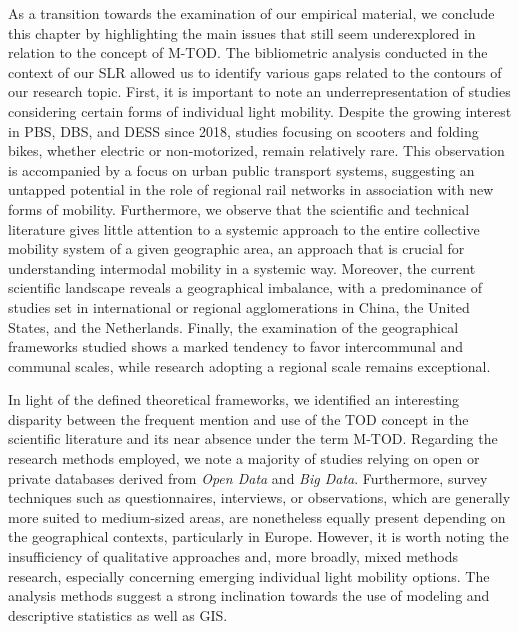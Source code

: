 \begin{refsegment}
As a transition towards the examination of our empirical material, we conclude this chapter by highlighting the main issues that still seem underexplored in relation to the concept of \acrshort{M-TOD}. The bibliometric analysis conducted in the context of our \acrshort{SLR} allowed us to identify various gaps related to the contours of our research topic. First, it is important to note an underrepresentation of studies considering certain forms of individual light mobility. Despite the growing interest in \acrshort{PBS}, \acrshort{DBS}, and \acrshort{DESS} since 2018, studies focusing on scooters and folding bikes, whether electric or non-motorized, remain relatively rare. This observation is accompanied by a focus on urban public transport systems, suggesting an untapped potential in the role of regional rail networks in association with new forms of mobility. Furthermore, we observe that the scientific and technical literature gives little attention to a systemic approach to the entire collective mobility system of a given geographic area, an approach that is crucial for understanding intermodal mobility in a systemic way. Moreover, the current scientific landscape reveals a geographical imbalance, with a predominance of studies set in international or regional agglomerations in China, the United States, and the Netherlands. Finally, the examination of the geographical frameworks studied shows a marked tendency to favor intercommunal and communal scales, while research adopting a regional scale remains exceptional.%

In light of the defined theoretical frameworks, we identified an interesting disparity between the frequent mention and use of the \acrshort{TOD} concept in the scientific literature and its near absence under the term \acrshort{M-TOD}. Regarding the research methods employed, we note a majority of studies relying on open or private databases derived from \textsl{Open Data} and \textsl{Big Data}. Furthermore, survey techniques such as questionnaires, interviews, or observations, which are generally more suited to medium-sized areas, are nonetheless equally present depending on the geographical contexts, particularly in Europe. However, it is worth noting the insufficiency of qualitative approaches and, more broadly, mixed methods research, especially concerning emerging individual light mobility options. The analysis methods suggest a strong inclination towards the use of modeling and descriptive statistics as well as \acrshort{GIS}.%


\end{refsegment}
